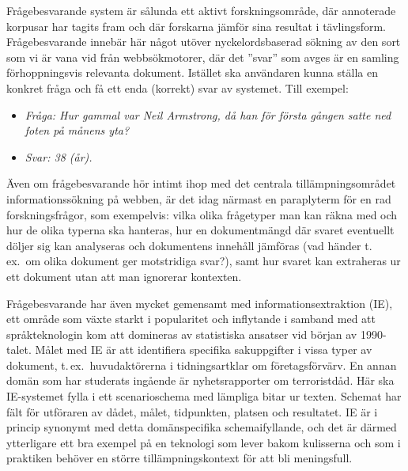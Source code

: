 \begin{multicols}{2}

Frågebesvarande system är sålunda ett aktivt forskningsområde, där
annoterade korpusar har tagits fram och där forskarna jämför sina
resultat i tävlingsform. Frågebesvarande innebär här något utöver
nyckelordsbaserad sökning av den sort som vi är vana vid från
webbsökmotorer, där det ''svar'' som avges är en samling
förhoppningsvis relevanta dokument. Istället ska användaren kunna
ställa en konkret fråga och få ett enda (korrekt) svar av
systemet. Till exempel:

\begin{itemize}
\item[]\textit{Fråga: Hur gammal var Neil Armstrong, då han för första gången satte ned foten på månens yta?}
\item[]\textit{Svar: 38 (år).}
\end{itemize}

Även om frågebesvarande hör intimt ihop med det centrala
tillämpningsområdet informationssökning på webben, är det idag närmast
en paraplyterm för en rad forskningsfrågor, som exempelvis: vilka
olika frågetyper man kan räkna med och hur de olika typerna ska
hanteras, hur en dokumentmängd där svaret eventuellt döljer sig kan
analyseras och dokumentens innehåll jämföras (vad händer t.\,ex.~om
olika dokument ger motstridiga svar?), samt hur svaret kan extraheras
ur ett dokument utan att man ignorerar kontexten.

Frågebesvarande har även mycket gemensamt med
in\-forma\-tions\-ex\-trak\-tion (IE), ett område som växte starkt i
popularitet och inflytande i samband med att språkteknologin kom att
domineras av statistiska ansatser vid början av 1990-talet. Målet med
IE är att identifiera specifika sakuppgifter i vissa typer av
dokument, t.\,ex.~huvudaktörerna i tidningsartklar om
företagsförvärv. En annan domän som har studerats ingående är
nyhetsrapporter om terroristdåd. Här ska IE-systemet fylla i ett
scenarioschema med lämpliga bitar ur texten. Schemat har fält för
utföraren av dådet, målet, tidpunkten, platsen och resultatet. IE är i
princip synonymt med detta domänspecifika schemaifyllande, och det är
därmed ytterligare ett bra exempel på en teknologi som lever bakom
kulisserna och som i praktiken behöver en större tillämpningskontext
för att bli meningsfull.


\end{multicols}
